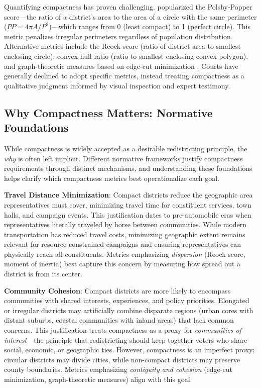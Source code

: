 Quantifying compactness has proven challenging. \citet{polsby1991} popularized the Polsby-Popper score---the ratio of a district's area to the area of a circle with the same perimeter ($PP = 4\pi A / P^2$)---which ranges from 0 (least compact) to 1 (perfect circle). This metric penalizes irregular perimeters regardless of population distribution. Alternative metrics include the Reock score (ratio of district area to smallest enclosing circle), convex hull ratio (ratio to smallest enclosing convex polygon), and graph-theoretic measures based on edge-cut minimization \citep{altman1998}. Courts have generally declined to adopt specific metrics, instead treating compactness as a qualitative judgment informed by visual inspection and expert testimony.

\subsection{Why Compactness Matters: Normative Foundations}

While compactness is widely accepted as a desirable redistricting principle, the \emph{why} is often left implicit. Different normative frameworks justify compactness requirements through distinct mechanisms, and understanding these foundations helps clarify which compactness metrics best operationalize each goal.

\textbf{Travel Distance Minimization}: Compact districts reduce the geographic area representatives must cover, minimizing travel time for constituent services, town halls, and campaign events. This justification dates to pre-automobile eras when representatives literally traveled by horse between communities. While modern transportation has reduced travel costs, minimizing geographic extent remains relevant for resource-constrained campaigns and ensuring representatives can physically reach all constituents. Metrics emphasizing \emph{dispersion} (Reock score, moment of inertia) best capture this concern by measuring how spread out a district is from its center.

\textbf{Community Cohesion}: Compact districts are more likely to encompass communities with shared interests, experiences, and policy priorities. Elongated or irregular districts may artificially combine disparate regions (urban cores with distant suburbs, coastal communities with inland areas) that lack common concerns. This justification treats compactness as a proxy for \emph{communities of interest}---the principle that redistricting should keep together voters who share social, economic, or geographic ties. However, compactness is an imperfect proxy: circular districts may divide cities, while non-compact districts may preserve county boundaries. Metrics emphasizing \emph{contiguity and cohesion} (edge-cut minimization, graph-theoretic measures) align with this goal.

